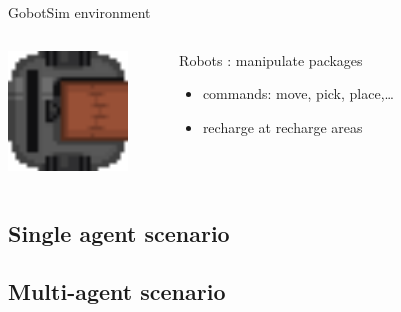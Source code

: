 \begin{frame}{GobotSim environment}
    \begin{columns}
        \begin{column}{0.2\textwidth}
            \includegraphics[width = 0.8\textwidth]{images/godot/robot_texture.png}
        \end{column}
        \begin{column}{0.7\textwidth}
            Robots : manipulate packages
            \begin{itemize}
                \item commands: move, pick, place,\dots
                \item recharge at recharge areas
            \end{itemize}
        \end{column}
    \end{columns}
\end{frame}

\subsection{Single agent scenario}



\subsection{Multi-agent scenario}

